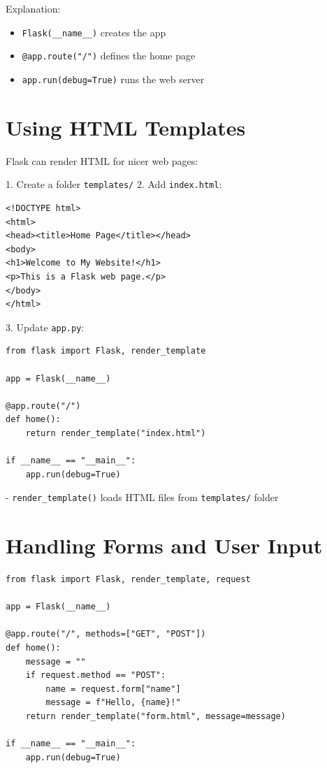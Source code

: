Explanation:

\begin{itemize}
    \item \texttt{Flask(\_\_name\_\_)} creates the app  
    \item \texttt{@app.route("/")} defines the home page  
    \item \texttt{app.run(debug=True)} runs the web server  
\end{itemize}

\section{Using HTML Templates}

Flask can render HTML for nicer web pages:

1. Create a folder \texttt{templates/}  
2. Add \texttt{index.html}:

\begin{verbatim}
<!DOCTYPE html>
<html>
<head><title>Home Page</title></head>
<body>
<h1>Welcome to My Website!</h1>
<p>This is a Flask web page.</p>
</body>
</html>
\end{verbatim}

3. Update \texttt{app.py}:

\begin{verbatim}
from flask import Flask, render_template

app = Flask(__name__)

@app.route("/")
def home():
    return render_template("index.html")

if __name__ == "__main__":
    app.run(debug=True)
\end{verbatim}

- \texttt{render\_template()} loads HTML files from \texttt{templates/} folder  

\section{Handling Forms and User Input}

\begin{verbatim}
from flask import Flask, render_template, request

app = Flask(__name__)

@app.route("/", methods=["GET", "POST"])
def home():
    message = ""
    if request.method == "POST":
        name = request.form["name"]
        message = f"Hello, {name}!"
    return render_template("form.html", message=message)

if __name__ == "__main__":
    app.run(debug=True)
\end{verbatim}

